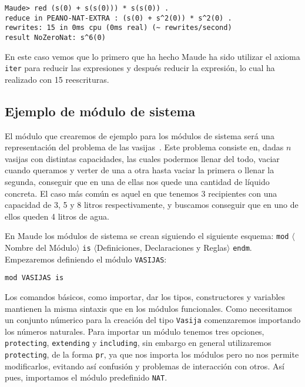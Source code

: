 {\codesize
\begin{verbatim}
Maude> red (s(0) + s(s(0))) * s(s(0)) .
reduce in PEANO-NAT-EXTRA : (s(0) + s^2(0)) * s^2(0) .
rewrites: 15 in 0ms cpu (0ms real) (~ rewrites/second)
result NoZeroNat: s^6(0)
\end{verbatim}
}

\noindent En este caso vemos que lo primero que ha hecho Maude ha sido utilizar el axioma \texttt{iter} para reducir las expresiones y después reducir la expresión, lo cual ha realizado con 15 reescrituras.

\subsection{Ejemplo de módulo de sistema}

El módulo que crearemos de ejemplo para los módulos de sistema será una representación del problema de las vasijas~\cite[capítulo 7]{maudeBook}. Este problema consiste en, dadas $n$ vasijas con distintas capacidades, las cuales podermos llenar del todo, vaciar cuando queramos y verter de una a otra hasta vaciar la primera o llenar la segunda, conseguir que en una de ellas nos quede una cantidad de líquido concreta. El caso más común es aquel en que tenemos $3$ recipientes con una capacidad de 3, 5 y 8 litros respectivamente, y buscamos conseguir que en uno de ellos queden 4 litros de agua. \par

En Maude los módulos de sistema se crean siguiendo el siguiente esquema: \texttt{mod} $\langle$Nombre del Módulo$\rangle$ \texttt{is} $\langle$Definiciones, Declaraciones y Reglas$\rangle$ \texttt{endm}. Empezaremos definiendo el módulo \texttt{VASIJAS}: \par

{\codesize
\begin{verbatim}
mod VASIJAS is
\end{verbatim}
}

Los comandos básicos, como importar, dar los tipos, constructores y variables mantienen la misma sintaxis que en los módulos funcionales. Como necesitamos un conjunto númerico para la creación del tipo \texttt{Vasija} comenzaremos importando los números naturales. Para importar un módulo tenemos tres opciones, \texttt{protecting}, \texttt{extending} y \texttt{including}, sin embargo en general utilizaremos \texttt{protecting}, de la forma \texttt{pr}, ya que nos importa los módulos pero no nos permite modificarlos, evitando así confusión y problemas de interacción con otros. Así pues, importamos el módulo predefinido \texttt{NAT}. \par

